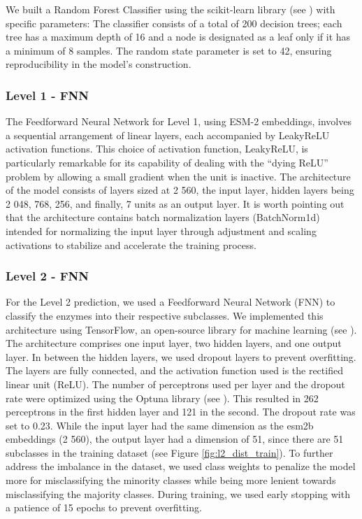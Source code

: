 \documentclass{bioinfo}
\begin{document}
\begin{methods}
We built a Random Forest Classifier using the scikit-learn library (see \cite{scikit-learn}) with specific parameters: 
The classifier consists of a total of 200 decision trees; each tree has a
maximum depth of 16 and a node is designated as a leaf only if it has a
minimum of 8 samples. The random state parameter is set to 42, ensuring
reproducibility in the model's construction.


\subsubsection{Level 1 - FNN}\label{sec:level1_methods}
The Feedforward Neural Network for Level 1, using ESM-2 embeddings, involves a sequential arrangement of linear layers, each accompanied by LeakyReLU activation functions.
This choice of activation function, LeakyReLU, is particularly remarkable for its capability of dealing with the ``dying ReLU'' problem by 
allowing a small gradient when the unit is inactive. 
The architecture of the model consists of layers sized at 2 560, the input layer, hidden layers being 2 048,
768, 256, and finally, 7 units as an output layer.
It is worth pointing out that the architecture contains batch normalization layers (BatchNorm1d) intended for 
normalizing the input layer through adjustment and scaling activations to stabilize and accelerate the training process.

\subsubsection{Level 2 - FNN}\label{sec:level2_methods}
For the Level 2 prediction, we used a Feedforward Neural Network (FNN) to classify the enzymes into their respective subclasses.
We implemented this architecture using TensorFlow, an open-source library for machine learning (see \cite{tensorflow2015-whitepaper}).
The architecture comprises one input layer, two hidden layers, and one output layer.
In between the hidden layers, we used dropout layers to prevent overfitting.
The layers are fully connected, and the activation function used is the rectified linear unit (ReLU).
The number of perceptrons used per layer and the dropout rate were optimized using the Optuna library (see \cite{optuna_2019}).
This resulted in 262 perceptrons in the first hidden layer and 121 in the second.
The dropout rate was set to 0.23.
While the input layer had the same dimension as the esm2b embeddings (2 560), the output layer had a dimension of 51,
since there are 51 subclasses in the training dataset (see Figure \ref{fig:l2_dist_train}).
To further address the imbalance in the dataset, we used class weights to penalize the model more for misclassifying the minority classes
while being more lenient towards misclassifying the majority classes.
During training, we used early stopping with a patience of 15 epochs to prevent overfitting.



\end{methods}
\end{document}
